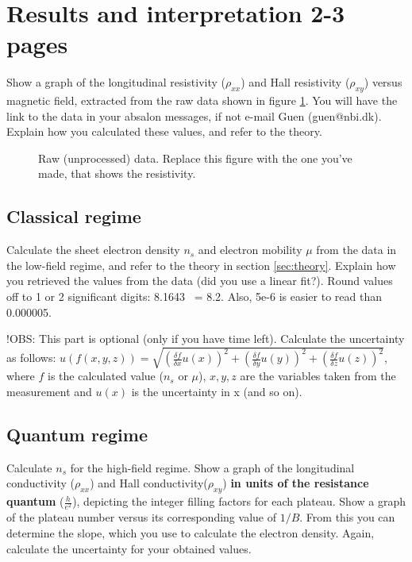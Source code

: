 \documentclass[a4paper]{article}
\begin{document}
\section{Results and interpretation 2-3 pages}
Show a graph of the longitudinal resistivity ($\rho_{xx}$) and Hall resistivity ($\rho_{xy}$) versus magnetic field, extracted from the raw data shown in figure \ref{fig:data}. You will have the link to the data in your absalon messages, if not e-mail Guen (guen@nbi.dk). Explain how you calculated these values, and refer to the theory.

\begin{figure}
\centering
\caption{\label{fig:data}Raw (unprocessed) data. Replace this figure with the one you've made, that shows the resistivity.}
\end{figure}

\subsection{Classical regime}
Calculate the sheet electron density $n_{s}$ and electron mobility $\mu$ from the data in the low-field regime, and refer to the theory in section \ref{sec:theory}. Explain how you retrieved the values from the data (did you use a linear fit?).
Round values off to 1 or 2 significant digits: 8.1643 ~= 8.2. Also, 5e-6 is easier to read than 0.000005.

!OBS: This part is optional (only if you have time left).
Calculate the uncertainty as follows: \newline $u(f(x, y, z)) = \sqrt{(\frac{\delta f}{\delta{x}} u(x))^{2} + (\frac{\delta f}{\delta{y}} u(y))^{2} + (\frac{\delta f}{\delta{z}} u(z))^{2}}$, where $f$ is the calculated value ($n_{s}$ or $\mu$), $x, y, z$ are the variables taken from the measurement and $u(x)$ is the uncertainty in x (and so on).

\subsection{Quantum regime}
Calculate $n_{s}$ for the high-field regime.
Show a graph of the longitudinal conductivity ($\rho_{xx}$) and Hall conductivity($\rho_{xy}$) \textbf{in units of the resistance quantum} ($\frac{h}{e^{2}}$), depicting the integer filling factors for each plateau.
Show a graph of the plateau number versus its corresponding value of $1/B$. From this you can determine the slope, which you use to calculate the electron density.
Again, calculate the uncertainty for your obtained values.
\end{document}
